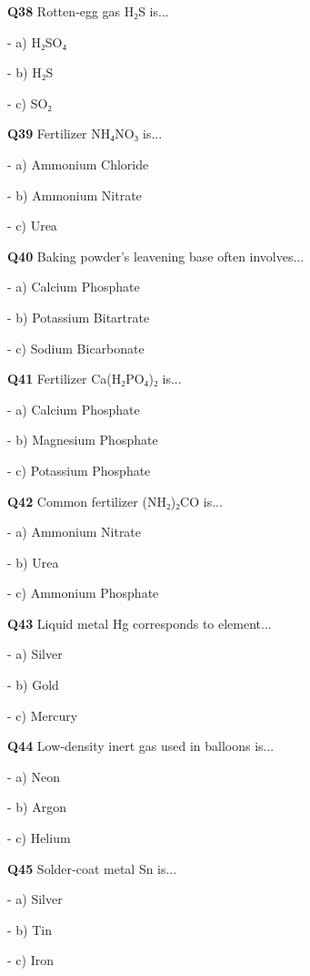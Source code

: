 \textbf{Q38} Rotten‑egg gas H₂S is...\par
\quad - a) H₂SO₄\par
\quad - b) H₂S\par
\quad - c) SO₂\par

\textbf{Q39} Fertilizer NH₄NO₃ is...\par
\quad - a) Ammonium Chloride\par
\quad - b) Ammonium Nitrate\par
\quad - c) Urea\par

\textbf{Q40} Baking powder's leavening base often involves...\par
\quad - a) Calcium Phosphate\par
\quad - b) Potassium Bitartrate\par
\quad - c) Sodium Bicarbonate\par

\textbf{Q41} Fertilizer Ca(H₂PO₄)₂ is...\par
\quad - a) Calcium Phosphate\par
\quad - b) Magnesium Phosphate\par
\quad - c) Potassium Phosphate\par

\textbf{Q42} Common fertilizer (NH₂)₂CO is...\par
\quad - a) Ammonium Nitrate\par
\quad - b) Urea\par
\quad - c) Ammonium Phosphate\par

\textbf{Q43} Liquid metal Hg corresponds to element...\par
\quad - a) Silver\par
\quad - b) Gold\par
\quad - c) Mercury\par

\textbf{Q44} Low‑density inert gas used in balloons is...\par
\quad - a) Neon\par
\quad - b) Argon\par
\quad - c) Helium\par

\textbf{Q45} Solder‑coat metal Sn is...\par
\quad - a) Silver\par
\quad - b) Tin\par
\quad - c) Iron\par

